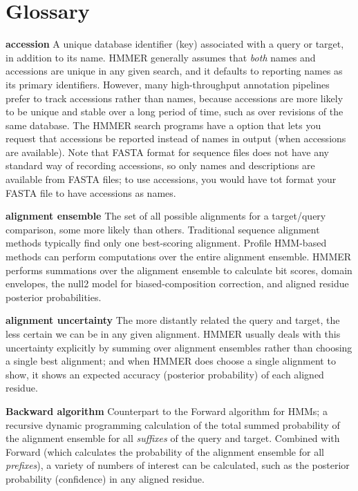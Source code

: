 
\section{Glossary}
\setcounter{footnote}{0}

\begin{wideitem}

\item[\textbf{accession}] A unique database identifier (key)
  associated with a query or target, in addition to its name. HMMER
  generally assumes that \emph{both} names and accessions are unique
  in any given search, and it defaults to reporting names as its
  primary identifiers. However, many high-throughput annotation
  pipelines prefer to track accessions rather than names, because
  accessions are more likely to be unique and stable over a long
  period of time, such as over revisions of the same database. The
  HMMER search programs have a  option that lets you
  request that accessions be reported instead of names in output (when
  accessions are available). Note that FASTA format for sequence files
  does not have any standard way of recording accessions, so only
  names and descriptions are available from FASTA files; to use
  accessions, you would have tot format your FASTA file to have
  accessions as names.

\item[\textbf{alignment ensemble}] The set of all possible alignments
  for a target/query comparison, some more likely than others.
  Traditional sequence alignment methods typically find only one
  best-scoring alignment. Profile HMM-based methods can perform
  computations over the entire alignment ensemble. HMMER performs
  summations over the alignment ensemble to calculate bit scores,
  domain envelopes, the null2 model for biased-composition correction,
  and aligned residue posterior probabilities.

\item[\textbf{alignment uncertainty}] The more distantly related the
  query and target, the less certain we can be in any given
  alignment. HMMER usually deals with this uncertainty explicitly by
  summing over alignment ensembles rather than choosing a single best
  alignment; and when HMMER does choose a single alignment to show, it
  shows an expected accuracy (posterior probability) of each aligned
  residue.

\item[\textbf{Backward algorithm}] Counterpart to the Forward
  algorithm for HMMs; a recursive dynamic programming calculation of
  the total summed probability of the alignment ensemble for all
  \emph{suffixes} of the query and target. Combined with Forward
  (which calculates the probability of the alignment ensemble for all
  \emph{prefixes}), a variety of numbers of interest can be
  calculated, such as the posterior probability (confidence) in any
  aligned residue.


\end{wideitem}
